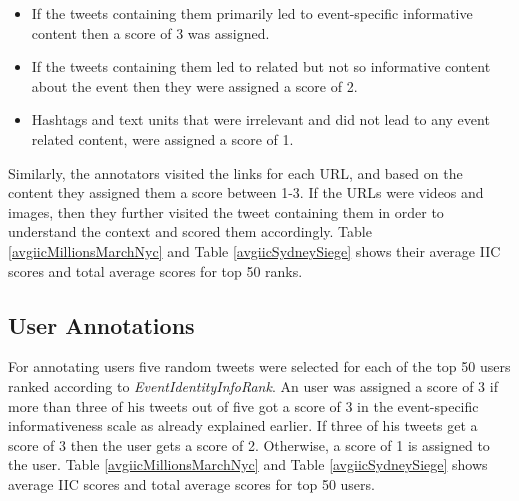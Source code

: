 \begin{itemize}
\item If the tweets containing them primarily led to event-specific informative content then a score of 3 was assigned.

\item If the tweets containing them led to related but not so informative content about the event then they were assigned a score of 2.

\item Hashtags and text units that were irrelevant and did not lead to any event related content, were assigned a score of 1.
\end{itemize}

Similarly, the annotators visited the links for each URL, and based on the content they assigned them a score between 1-3. If the URLs were videos and images, then they further visited the tweet containing them in order to understand the context and scored them accordingly. Table \ref{avgiicMillionsMarchNyc} and Table \ref{avgiicSydneySiege} shows their average IIC scores and total average scores for top 50 ranks. 

\subsection{User Annotations} 
For annotating users five random tweets were selected for each of the top 50 users ranked according to \textit{EventIdentityInfoRank}. An user was assigned a score of 3 if more than three of his tweets out of five got a score of 3 in the event-specific informativeness scale as already explained earlier. If three of his tweets get a score of 3 then the user gets a score of 2. Otherwise, a score of 1 is assigned to the user. Table \ref{avgiicMillionsMarchNyc} and Table \ref{avgiicSydneySiege} shows average IIC scores and total average scores for top 50 users.

